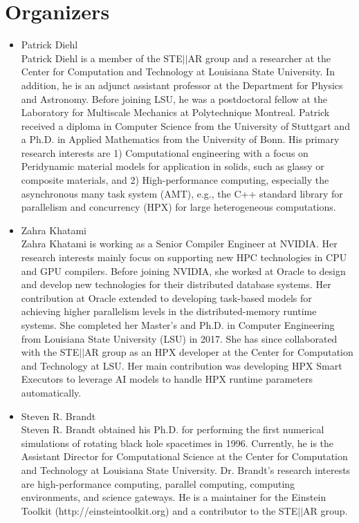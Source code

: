 \documentclass{article}
\begin{document}
\section*{Organizers} 
\begin{itemize}
\item Patrick Diehl \\
Patrick Diehl is a member of the STE$\vert\vert$AR group and a researcher at the Center for Computation and Technology at Louisiana State University. In addition, he is an adjunct assistant professor at the Department for Physics and Astronomy. Before joining LSU, he was a postdoctoral fellow at the Laboratory for Multiscale Mechanics at Polytechnique Montreal. Patrick received a diploma in Computer Science from the University of Stuttgart and a Ph.D. in Applied Mathematics from the University of Bonn. His primary research interests are 1) Computational engineering with a focus on Peridynamic material models for application in solids, such as glassy or composite materials, and 2) High-performance computing, especially the asynchronous many task system (AMT), e.g., the C++ standard library for parallelism and concurrency (HPX) for large heterogeneous computations.
\item Zahra Khatami \\
Zahra Khatami is working as a Senior Compiler Engineer at NVIDIA. Her research interests mainly focus on supporting new HPC technologies in CPU and GPU compilers. Before joining NVIDIA, she worked at Oracle to design and develop new technologies for their distributed database systems. Her contribution at Oracle extended to developing task-based models for achieving higher parallelism levels in the distributed-memory runtime systems. She completed her Master’s and Ph.D. in Computer Engineering from Louisiana State University (LSU) in 2017. She has since collaborated with the STE$\vert\vert$AR group as an HPX developer at the Center for Computation and Technology at LSU. Her main contribution was developing HPX Smart Executors to leverage AI models to handle HPX runtime parameters automatically.
\item Steven R. Brandt\\
Steven R. Brandt obtained his Ph.D. for performing the first numerical simulations of rotating black hole spacetimes in 1996. Currently, he is the Assistant Director for Computational Science at the Center for Computation and Technology at Louisiana State University. Dr. Brandt's research interests are high-performance computing, parallel computing, computing environments, and science gateways. He is a maintainer for the Einstein Toolkit (http://einsteintoolkit.org) and a contributor to the STE$\vert\vert$AR group.

\end{itemize}
\end{document}
